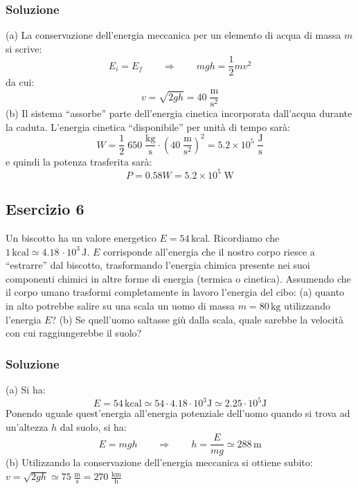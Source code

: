 \documentclass[12pt,a4paper]{book}
\begin{document}
\subsubsection*{Soluzione}
(a) La conservazione dell'energia meccanica per un elemento di acqua di massa $m$ si scrive:
\begin{equation*}
E_{i}=E_{f} \qquad  \Rightarrow \qquad mgh=\frac{1}{2} m v^2
\end{equation*}
da cui:
\begin{equation*}
v=\sqrt{2gh}=40\; \frac{\text{m}}{\text{s}^2}
\end{equation*}
(b) Il sistema ``assorbe'' parte dell'energia cinetica incorporata dall'acqua durante la caduta. L'energia cinetica ``disponibile'' per unità di tempo sarà:
\begin{equation*}
W= \frac{1}{2}\;650 \; \frac{\text{kg}}{\text{s}} \cdot \left( 40\; \frac{\text{m}}{\text{s}^2}\right)^2=5.2\times 10^5\; \frac{\text{J}}{\text{s}}
\end{equation*}
e quindi la potenza trasferita sarà:
\begin{equation*}
P=0.58 W = 5.2\times 10^5\; \text{W}
\end{equation*}


\subsection*{Esercizio 6}
Un biscotto ha un valore energetico $E=54 \,$kcal. Ricordiamo che $1 \, \text{kcal} \simeq 4.18 \, \cdot 10^3 \, \text{J}$. $E$
corrisponde all'energia che il nostro corpo riesce a ``estrarre'' dal biscotto, trasformando l'energia chimica presente nei suoi componenti chimici in altre forme di energia (termica o cinetica).  Assumendo che il corpo umano trasformi completamente in lavoro l'energia del cibo: 
(a) quanto in alto potrebbe salire su una scala un uomo di massa $m=80 \, \text{kg}$ utilizzando l'energia $E$? (b) Se quell'uomo saltasse giù dalla scala, quale sarebbe la velocità con cui raggiungerebbe il suolo?

\subsubsection*{Soluzione}
(a) Si ha:
\begin{equation*}
E= 54 \, \text{kcal} \simeq  54 \cdot 4.18 \cdot 10^3 \text{J} \simeq 2.25  \cdot 10^5 \text{J}
\end{equation*}
Ponendo uguale quest'energia all'energia potenziale dell'uomo quando si trova ad un'altezza $h$ dal suolo, si ha:
\begin{equation*}
E=mgh \qquad \Rightarrow \qquad h=\frac{E}{mg}\simeq 288 \, \text{m}
\end{equation*}
(b) Utilizzando la conservazione dell'energia meccanica si ottiene subito:
$v=\sqrt{2gh}\simeq 75 \;\frac{\text{m}}{\text{s}}= 270 \;\frac{\text{km}}{\text{h}}$
\end{document}
